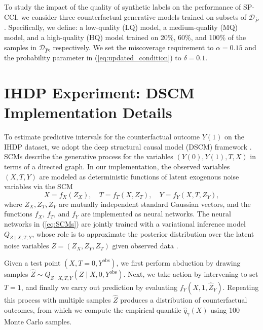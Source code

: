 \documentclass{article}
\theoremstyle{plain}
\theoremstyle{definition}
\theoremstyle{remark}
\begin{document}
To study the impact of the quality of synthetic labels on the performance of SP-CCI, we consider three counterfactual generative models trained on subsets of \(\mathcal{D}_{ \hat{P}}\). Specifically, we define: a low-quality (LQ) model, a medium-quality (MQ) model, and a high-quality (HQ) model trained on 20\%, 60\%, and 100\% of the samples in \(\mathcal{D}_{ \hat{P}}\), respectively. We set the miscoverage requirement to \(\alpha = 0.15\) and the probability parameter in (\ref{eq:updated_condition}) to \(\delta = 0.1\).

\section{IHDP Experiment: DSCM Implementation Details}
\label{appendix:ihdp_setup}

To estimate predictive intervals for the counterfactual outcome \( Y(1) \) on the IHDP dataset, we adopt the deep structural causal model (DSCM) framework \citep{pawlowski2020deep}. SCMs describe the generative process for the variables $(Y(0), Y(1), T, X)$ in terms of a directed graph. In our implementation, the observed variables \((X, T, Y)\) are modeled as deterministic functions of latent exogenous noise variables via the SCM
\begin{equation}
\label{eq:SCMs}
X = f_X(Z_X),\quad T = f_T(X, Z_T),\quad Y = f_Y(X, T, Z_Y),
\end{equation}
where \(Z_X, Z_T, Z_Y\) are mutually independent standard Gaussian vectors, and the functions \(f_X\), \(f_T\), and \(f_Y\) are implemented as neural networks. The neural networks in (\ref{eq:SCMs}) are jointly trained with a variational inference model \(Q_{Z \mid X, T, Y}\), whose role is to approximate the posterior distribution over the latent noise variables $Z = (Z_X, Z_Y, Z_T)$ given observed data \citep{pawlowski2020deep}.

Given a test point \((X, T=0, Y^{\text{obs}})\), we first perform abduction by drawing samples \(\hat{Z} \sim Q_{Z\mid X, T, Y}(Z \mid X, 0, Y^{\text{obs}})\). Next, we take action by intervening to set \(T = 1\), and finally we carry out prediction by evaluating \(f_Y(X, 1, \hat{Z}_Y)\). Repeating this process with multiple samples \(\hat{Z}\) produces a distribution of counterfactual outcomes, from which we compute the empirical quantile \(\hat{q}_\gamma(X)\) using 100 Monte Carlo samples.
\end{document}

